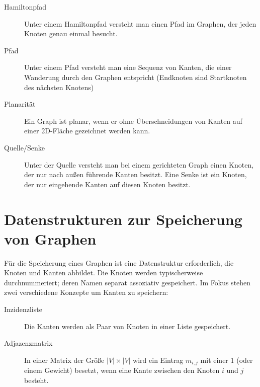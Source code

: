 \begin{description}
  \item[Hamiltonpfad]
   Unter einem Hamiltonpfad versteht man einen Pfad im Graphen, der jeden Knoten genau einmal besucht.
  \item[Pfad]
   Unter einem Pfad versteht man eine Sequenz von Kanten, die einer Wanderung durch den Graphen entspricht (Endknoten sind Startknoten des nächsten Knotens)
  \item[Planarität]
   Ein Graph ist planar, wenn er ohne Überschneidungen von Kanten auf einer 2D-Fläche gezeichnet werden kann.
  \item[Quelle/Senke]
   Unter der Quelle versteht man bei einem gerichteten Graph einen Knoten, der nur nach außen führende Kanten besitzt. Eine Senke ist ein Knoten, der nur eingehende Kanten auf diesen Knoten besitzt.
\end{description}

\section{Datenstrukturen zur Speicherung von Graphen}
%
Für die Speicherung eines Graphen ist eine Datenstruktur erforderlich, die Knoten und Kanten abbildet. Die Knoten werden typischerweise durchnummeriert; deren Namen separat assoziativ gespeichert. Im Fokus stehen zwei verschiedene Konzepte um Kanten zu speichern:
%
\begin{description}
  \item[Inzidenzliste]
    Die Kanten werden als Paar von Knoten in einer Liste gespeichert.
  \item[Adjazenzmatrix]
    In einer Matrix der Größe $|V|\times |V|$ wird ein Eintrag $m_{i,j}$ mit einer 1 (oder einem Gewicht) besetzt,
    wenn eine Kante zwischen den Knoten $i$ und $j$ besteht.
\end{description}